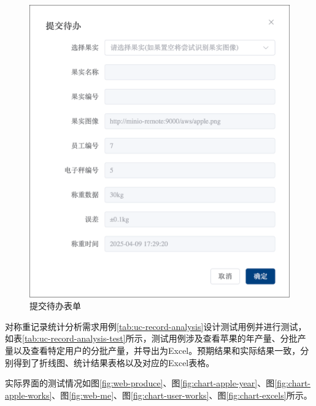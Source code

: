 \begin{figure}
    \centering
    \includegraphics[height=0.5\textheight]{../result/form-todo-handle.png}
    \caption{提交待办表单}
    \label{fig:form-todo-handle}
\end{figure}

对称重记录统计分析需求用例\ref{tab:uc-record-analysis}设计测试用例并进行测试，如表\ref{tab:uc-record-analysis-test}所示，测试用例涉及查看苹果的年产量、分批产量以及查看特定用户的分批产量，并导出为Excel。预期结果和实际结果一致，分别得到了折线图、统计结果表格以及对应的Excel表格。

实际界面的测试情况如图\ref{fig:web-produce}、图\ref{fig:chart-apple-year}、图\ref{fig:chart-apple-works}、图\ref{fig:web-me}、图\ref{fig:chart-user-works}、图\ref{fig:chart-excels}所示。

